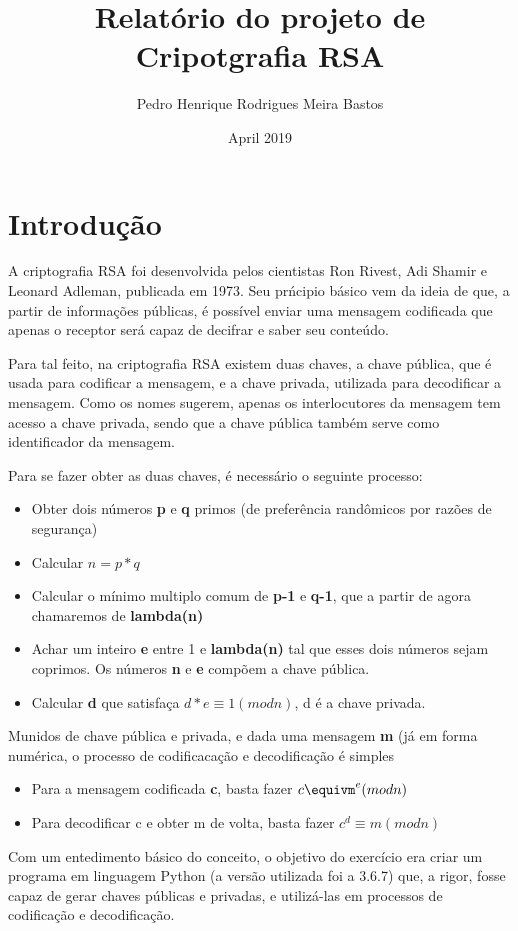 \documentclass[12pt,A4]{report}
\title{Relatório do projeto de Cripotgrafia RSA}
\author{Pedro Henrique Rodrigues Meira Bastos}
\date{April 2019}
\begin{document}
\maketitle

\section{Introdução}

A criptografia RSA foi desenvolvida pelos cientistas Ron Rivest, Adi Shamir e Leonard Adleman, publicada em 1973. Seu prńcipio básico vem da ideia de que, a partir de informações públicas, é possível enviar uma mensagem codificada que apenas o receptor será capaz de decifrar e saber seu conteúdo.

Para tal feito, na criptografia RSA existem duas chaves, a chave pública, que é usada para codificar a mensagem, e a chave privada, utilizada para decodificar a mensagem. Como os nomes sugerem, apenas os interlocutores da mensagem tem acesso a chave privada, sendo que a chave pública também serve como identificador da mensagem.

Para se fazer obter as duas chaves, é necessário o seguinte processo:
\begin{itemize}
    \item Obter dois números \textbf{p} e \textbf{q}  primos (de preferência randômicos por razões de segurança)
    \item Calcular $n = p*q$
    \item Calcular o mínimo multiplo comum de \textbf{p-1} e \textbf{q-1}, que a partir de agora chamaremos de \textbf{lambda(n)}
    \item Achar um inteiro \textbf{e} entre 1 e \textbf{lambda(n)} tal que esses dois números sejam coprimos. Os números \textbf{n} e \textbf{e} compõem a chave pública.
    \item Calcular \textbf{d} que satisfaça $d*e\equiv 1 (mod n)$, d é a chave privada.
\end{itemize}
Munidos de chave pública e privada, e dada uma mensagem \textbf{m} (já em forma numérica, o processo de codificacação e decodificação é simples
\begin{itemize}
    \item Para a mensagem codificada \textbf{c}, basta fazer $c\equivm^e (mod n)$
    \item Para decodificar c e obter m de volta, basta fazer $c^d\equiv m (mod n)$
\end{itemize}
Com um entedimento básico do conceito, o objetivo do exercício era criar um programa em linguagem Python (a versão utilizada foi a 3.6.7) que, a rigor, fosse capaz de gerar chaves públicas e privadas, e utilizá-las em processos de codificação e decodificação.
\end{document}
